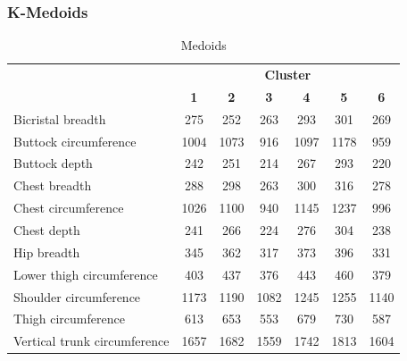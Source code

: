 \documentclass[12pt,a4paper,openany,UKenglish]{scrreprt}
\begin{document}
\subsubsection{K-Medoids}
\begin{table}[H]
	\footnotesize
	\centering
	\caption{Medoids}
	\begin{tabular}{lcccccc}
		\cline{2-7}
		                             & \multicolumn{6}{c}{\textbf{Cluster}}                                                                  \\
		                             & \textbf{1}                           & \textbf{2} & \textbf{3} & \textbf{4} & \textbf{5} & \textbf{6} \\
		\hline\hline
		Bicristal breadth            & 275                                  & 252        & 263        & 293        & 301        & 269        \\
		Buttock circumference        & 1004                                 & 1073       & 916        & 1097       & 1178       & 959        \\
		Buttock depth                & 242                                  & 251        & 214        & 267        & 293        & 220        \\
		Chest breadth                & 288                                  & 298        & 263        & 300        & 316        & 278        \\
		Chest circumference          & 1026                                 & 1100       & 940        & 1145       & 1237       & 996        \\
		Chest depth                  & 241                                  & 266        & 224        & 276        & 304        & 238        \\
		Hip breadth                  & 345                                  & 362        & 317        & 373        & 396        & 331        \\
		Lower thigh circumference    & 403                                  & 437        & 376        & 443        & 460        & 379        \\
		Shoulder circumference       & 1173                                 & 1190       & 1082       & 1245       & 1255       & 1140       \\
		Thigh circumference          & 613                                  & 653        & 553        & 679        & 730        & 587        \\
		Vertical trunk circumference & 1657                                 & 1682       & 1559       & 1742       & 1813       & 1604       \\

\end{tabular}
\end{table}
\end{document}
